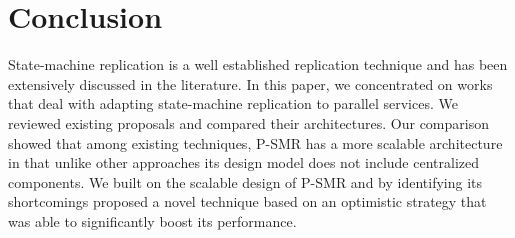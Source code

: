 \documentclass[conference]{IEEEtran}
\begin{document}
\section{Conclusion}
\label{sec:final}

State-machine replication is a well established replication technique and has been extensively discussed in the literature. 
In this paper, we concentrated on works that deal with adapting state-machine replication to parallel services. 
We reviewed existing proposals and compared their architectures. Our comparison showed that among existing techniques, P-SMR has a more scalable architecture in that unlike other approaches its design model does not include centralized components. We built on the scalable design of P-SMR and by identifying its shortcomings proposed  a novel technique based on an optimistic strategy that was able to significantly boost its performance.






\end{document}
